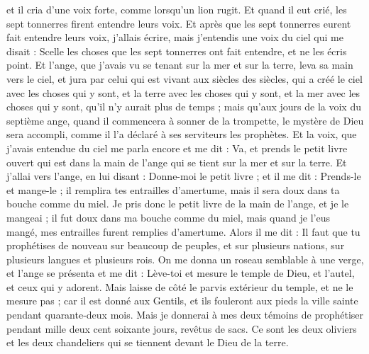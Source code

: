 \begin{multicols}{2}
et il cria d'une voix forte, comme lorsqu'un lion rugit. Et quand il eut crié, les sept tonnerres firent entendre leurs voix.
Et après que les sept tonnerres eurent fait entendre leurs voix, j'allais écrire, mais j'entendis une voix du ciel qui me disait : Scelle les choses que les sept tonnerres ont fait entendre, et ne les écris point.
Et l'ange, que j'avais vu se tenant sur la mer et sur la terre, leva sa main vers le ciel,
et jura par celui qui est vivant aux siècles des siècles, qui a créé le ciel avec les choses qui y sont, et la terre avec les choses qui y sont, et la mer avec les choses qui y sont, qu'il n'y aurait plus de temps ;
mais qu'aux jours de la voix du septième ange, quand il commencera à sonner de la trompette, le mystère de Dieu sera accompli, comme il l'a déclaré à ses serviteurs les prophètes.
Et la voix, que j'avais entendue du ciel me parla encore et me dit : Va, et prends le petit livre ouvert qui est dans la main de l'ange qui se tient sur la mer et sur la terre.
Et j'allai vers l'ange, en lui disant : Donne-moi le petit livre ; et il me dit : Prends-le et mange-le ; il remplira tes entrailles d'amertume, mais il sera doux dans ta bouche comme du miel.
Je pris donc le petit livre de la main de l'ange, et je le mangeai ; il fut doux dans ma bouche comme du miel, mais quand je l'eus mangé, mes entrailles furent remplies d'amertume.
Alors il me dit : Il faut que tu prophétises de nouveau sur beaucoup de peuples, et sur plusieurs nations, sur plusieurs langues et plusieurs rois.
\VerseOne{}On me donna un roseau semblable à une verge, et l'ange se présenta et me dit : Lève-toi et mesure le temple de Dieu, et l'autel, et ceux qui y adorent.
Mais laisse de côté le parvis extérieur du temple, et ne le mesure pas ; car il est donné aux Gentils, et ils fouleront aux pieds la ville sainte pendant quarante-deux mois.
Mais je donnerai à mes deux témoins de prophétiser pendant mille deux cent soixante jours, revêtus de sacs.
Ce sont les deux oliviers et les deux chandeliers qui se tiennent devant le Dieu de la terre. 

\end{multicols}
